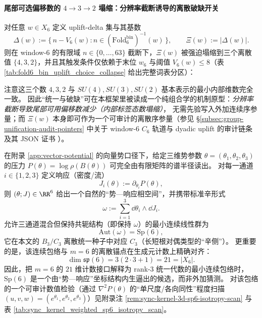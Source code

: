 \paragraph{尾部可选偏移数的 \texorpdfstring{$4\to 3\to 2$}{4->3->2} 塌缩：分辨率截断诱导的离散破缺开关}
对任意 \(w\in X_6\) 定义 uplift-delta 集与其基数
\[
\Delta(w):=\{\,n-V_6(w): n\in (\mathrm{Fold}^{\mathrm{bin}}_6)^{-1}(w)\,\},\qquad
\Xi(w):=|\Delta(w)|.
\]
则在 window-6 的有限域 \(n\in\{0,\dots,63\}\) 截断下，\(\Xi(w)\) 被强迫塌缩到三个离散值 \(\{4,3,2\}\)，并且其触发条件仅依赖于末位 \(w_6\) 与阈值 \(V_6(w)\le 8\)（表 \ref{tab:fold6_bin_uplift_choice_collapse} 给出完整词表分区）：

\par
注意这三个数 \(4,3,2\) 与 \(SU(4),SU(3),SU(2)\) 基本表示的最小内部维数完全一致。
因此“统一与破缺”可在本框架里被读成一个纯组合学的机制原型：\emph{分辨率截断导致尾部可用偏移数减少（内部标签态数塌缩）}，
无需先验写入外加连续序参量；而 \(\Xi(w)\) 本身即可作为一个可审计的离散序参量（参见 \S\ref{subsec:group-unification-audit-pointers} 中关于 window-6 \(C_6\) 轨道与 dyadic uplift 的审计链条及其 JSON 证书 \texttt{}）。

\begin{remark}[三通道势—响应辛相空间与 \texorpdfstring{$C_3=\mathrm{Sp}(6)$}{C3=Sp(6)} 连续包络]\label{rem:sp6-minimal-continuous-envelope}
在附录 \ref{app:vector-potential} 的向量势口径下，给定三维势参数 \(\theta=(\theta_1,\theta_2,\theta_3)\) 的压力
\(
P(\theta)=\log\rho(B(\theta))
\)
可完全由有限矩阵的谱半径读出。
对每一通道 \(i\in\{1,2,3\}\) 定义响应（密度/流）
\[
J_i(\theta):=\partial_{\theta_i}P(\theta),
\]
则 \((\theta;J)\in\RR^6\) 给出一个自然的“势—响应相空间”，并携带标准辛形式
\[
\omega:=\sum_{i=1}^{3}\dd\theta_i\wedge \dd J_i.
\]
允许三通道混合但保持共轭结构（即保持 \(\omega\)）的最小连续线性群为
\[
\mathrm{Aut}(\omega)=\mathrm{Sp}(6),
\]
它在本文的 \(B_3/C_3\) 离散统一种子中对应 \(C_3\)（长短根对偶类型的“辛侧”）。
更重要的是，该连续包络与 \(m=6\) 的离散锚点在生成元计数上精确对齐：
\[
\dim\mathfrak{sp}(6)=3(2\cdot 3+1)=21=|X_6|.
\]
因此，把 \(m=6\) 的 \(21\) 维计数接口解释为 rank-\(3\) 统一代数的最小连续包络时，\(\mathrm{Sp}(6)\) 是一个由“势—响应”坐标结构内生逼出的候选，而非外加猜测。
对该包络的一个可审计数值检验（通过 \(\nabla^2P(\theta)\) 的“单尺度/各向同性”程度扫描 \((u,v,w)=(e^{\theta_1},e^{\theta_2},e^{\theta_3})\)）见附录注 \ref{rem:sync-kernel-3d-sp6-isotropy-scan} 与表 \ref{tab:sync_kernel_weighted_sp6_isotropy_scan}。
\end{remark}

